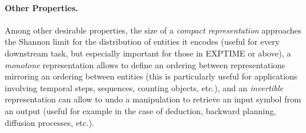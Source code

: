 \paragraph{Other Properties.} Among other desirable properties, the size of a \textit{compact representation} approaches the Shannon limit for the distribution of entities it encodes (useful for every downstream task, but especially important for those in \textsc{EXPTIME} or above), a \textit{monotone} representation allows to define an ordering between representations mirroring an ordering between entities (this is particularly useful for applications involving temporal steps, sequences, counting objects, etc.), and an \textit{invertible} representation can allow to undo a manipulation to retrieve an input symbol from an output (useful for example in the case of deduction, backward planning, diffusion processes, etc.).



%
%
%

